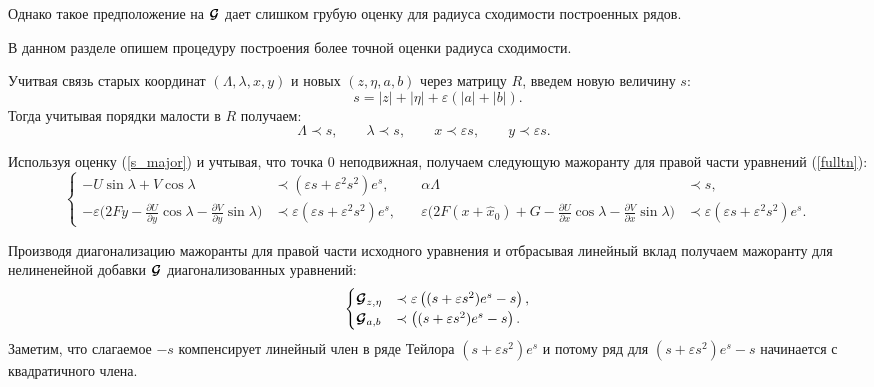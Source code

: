Однако такое предположение на $\boldsymbol{\mathcal{G}}$ дает слишком грубую оценку для радиуса сходимости построенных рядов.

В данном разделе опишем процедуру построения более точной оценки радиуса сходимости.

Учитвая связь старых координат $(\Lambda, \lambda, x, y)$ и новых $(z, \eta, a,b)$ через матрицу $R$, введем новую величину $s$:
$$s = |z| + |\eta| + \varepsilon(|a|+|b|).$$
Тогда учитывая порядки малости в $R$ получаем:
\begin{equation}
\Lambda \prec s,\qquad
\lambda \prec s,\qquad
x \prec \varepsilon s,\qquad
y \prec \varepsilon s.\qquad
\label{s_major}
\end{equation}

Используя оценку (\ref{s_major}) и учтывая, что точка $0$ неподвижная, получаем следующую мажоранту для правой части уравнений (\ref{fulltn}):
\begingroup
\small
\begin{equation*}
    \left\{
    \begin{aligned}
        - U \sin \lambda + V \cos \lambda &\prec (\varepsilon s + \varepsilon^2 s^2)e^{s},
        &\quad
        \alpha \Lambda &\prec s, \\[0.5ex]
        -\varepsilon \big( 2Fy-\tfrac{\partial U}{\partial y} \cos \lambda - \tfrac{\partial V}{\partial y} \sin \lambda \big) &\prec \varepsilon (\varepsilon s + \varepsilon^2 s^2)e^{s},
        &\quad
        \varepsilon \big( 2F(x+\hat x_0)+G -\tfrac{\partial U}{\partial x} \cos \lambda - \tfrac{\partial V}{\partial x} \sin \lambda \big) &\prec \varepsilon (\varepsilon s + \varepsilon^2 s^2)e^{s}.
    \end{aligned}
    \right.
\end{equation*}
\endgroup

Производя диагонализацию мажоранты для правой части исходного уравнения и отбрасывая линейный вклад получаем мажоранту для нелиненейной добавки $\boldsymbol{\mathcal{G}}$ диагонализованных уравнений: 
\begin{equation}
\begin{cases}
\boldsymbol{\mathcal{G}}_{z,\eta} &\prec \varepsilon \left( (s + \varepsilon s^2)e^{s} - s \right), \\
\boldsymbol{\mathcal{G}}_{a,b}    &\prec \left( (s + \varepsilon s^2)e^{s} - s \right).
\label{res_g}
\end{cases}
\end{equation}
Заметим, что слагаемое $-s$ компенсирует линейный член в ряде Тейлора $(s + \varepsilon s^2)e^{s}$ и потому ряд для $(s + \varepsilon s^2)e^{s} - s$ начинается с квадратичного члена.

